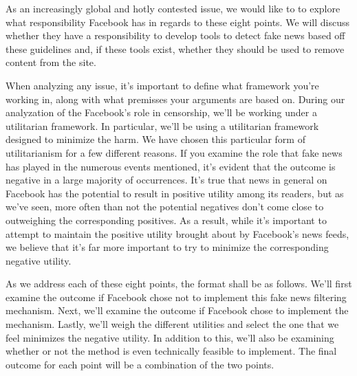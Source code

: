 \documentclass[12pt]{article}
\begin{document}
As an increasingly global and hotly contested issue, we would like to to explore what responsibility Facebook has in regards to these eight points. We will discuss whether they have a responsibility to develop tools to detect fake news based off these guidelines and, if these tools exist, whether they should be used to remove content from the site.

When analyzing any issue, it's important to define what framework you're working in, along with what premisses your arguments are based on. During our analyzation of the Facebook's role in censorship, we'll be working under a utilitarian framework. In particular, we'll be using a utilitarian framework designed to minimize the harm. We have chosen this particular form of utilitarianism for a few different reasons. If you examine the role that fake news has played in the numerous events mentioned, it's evident that the outcome is negative in a large majority of occurrences. It's true that news in general on Facebook has the potential to result in positive utility among its readers, but as we've seen, more often than not the potential negatives don't come close to outweighing the corresponding positives. As a result, while it's important to attempt to maintain the positive utility brought about by Facebook's news feeds, we believe that it's far more important to try to minimize the corresponding negative utility.

As we address each of these eight points, the format shall be as follows. We'll first examine the outcome if Facebook chose not to implement this fake news filtering mechanism. Next, we'll examine the outcome if Facebook chose to implement the mechanism. Lastly, we'll weigh the different utilities and select the one that we feel minimizes the negative utility. In addition to this, we'll also be examining whether or not the method is even technically feasible to implement. The final outcome for each point will be a combination of the two points. 
\end{document}
